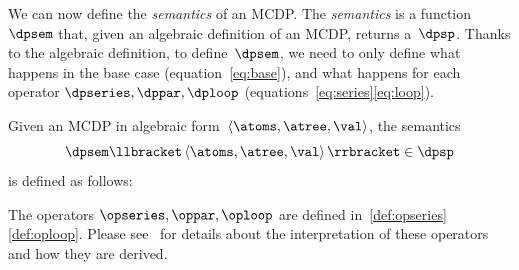 We can now define the \emph{semantics} of an MCDP. The \emph{semantics}
is a function~$\dpsem$ that, given an algebraic definition of an
MCDP, returns a~$\dpsp$. Thanks to the algebraic definition, to
define~$\dpsem$, we need to only define what happens in the base
case (equation~\ref{eq:base}), and what happens for each operator
$\dpseries,\dppar,\dploop$ (equations~\ref{eq:series}\textendash \ref{eq:loop}).
\begin{definition}
  \label{def:dpsem}Given an MCDP in algebraic form~$\left\langle \atoms,\atree,\val\right\rangle $,
  the semantics
  \[
    \dpsem\llbracket\left\langle \atoms,\atree,\val\right\rangle \rrbracket\in\dpsp
  \]
  is defined as follows:

  \vspace{-5mm}
\end{definition}
The operators $\opseries,\oppar,\oploop$ are defined in~\cref{def:opseries}\textendash \cref{def:oploop}.
Please see~\cite[Section VI]{censi16codesign_sep16} for details
about the interpretation of these operators and how they are derived.

